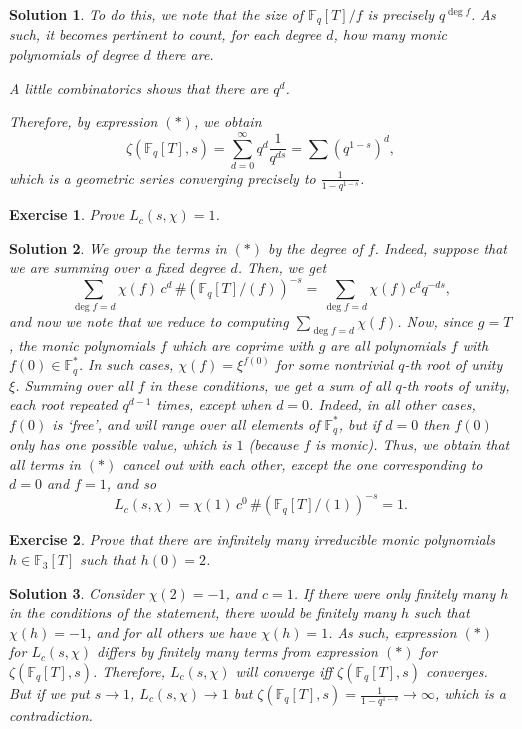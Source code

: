 \documentclass{article}
\newtheorem{ex}{Exercise}
\theoremstyle{nonumberplain}
\newtheorem{sol}{Solution}
\newcommand{\FF}{\mathbb{F}}
\begin{document}
\begin{sol}
To do this, we note that the size of $\FF_q[T]/f$ is precisely $q^{\deg f}$. As such, it becomes pertinent to count, for each degree $d$, how many monic polynomials of degree $d$ there are.

A little combinatorics shows that there are $q^d$.

Therefore, by expression $(*)$, we obtain
\begin{equation}
\zeta(\FF_q[T],s) = \sum_{d=0}^\infty q^d \frac1{q^{ds}} = \sum (q^{1-s})^d,
\end{equation}
which is a geometric series converging precisely to $\frac1{1-q^{1-s}}$.
\end{sol}

\begin{ex}
Prove $L_c(s,\chi) = 1$.
\end{ex}

\begin{sol}
We group the terms in $(*)$ by the degree of $f$. Indeed, suppose that we are summing over a fixed degree $d$. Then, we get
\begin{equation}
\sum_{\deg f = d} \chi(f) \, c^d \, \#(\FF_q[T]/(f))^{-s} = \sum_{\deg f = d} \chi(f) c^d q^{-ds},
\end{equation}
and now we note that we reduce to computing $\sum_{\deg f = d} \chi(f)$. Now, since $g = T$, the monic polynomials $f$ which are coprime with $g$ are all polynomials $f$ with $f(0) \in \FF_q^*$. In such cases, $\chi(f) = \xi^{f(0)}$ for some nontrivial $q$-th root of unity $\xi$. Summing over all $f$ in these conditions, we get a sum of all $q$-th roots of unity, each root repeated $q^{d-1}$ times, \emph{except} when $d = 0$. Indeed, in all other cases, $f(0)$ is `free', and will range over all elements of $\FF_q^*$, but if $d = 0$ then $f(0)$ only has one possible value, which is $1$ (because $f$ is monic). Thus, we obtain that all terms in $(*)$ cancel out with each other, except the one corresponding to $d = 0$ and $f = 1$, and so
\begin{equation}
L_c(s,\chi) = \chi(1) \, c^0 \, \#(\FF_q[T]/(1))^{-s} = 1.
\end{equation}
\end{sol}

\begin{ex}
Prove that there are infinitely many irreducible monic polynomials $h \in \FF_3[T]$ such that $h(0) = 2$.
\end{ex}

\begin{sol}
Consider $\chi(2) = -1$, and $c = 1$. If there were only finitely many $h$ in the conditions of the statement, there would be finitely many $h$ such that $\chi(h) = -1$, and for all others we have $\chi(h) = 1$. As such, expression $(*)$ for $L_c(s,\chi)$ differs by finitely many terms from expression $(*)$ for $\zeta(\FF_q[T],s)$. Therefore, $L_c(s,\chi)$ will converge iff $\zeta(\FF_q[T],s)$ converges. But if we put $s \to 1$, $L_c(s,\chi) \to 1$ but $\zeta(\FF_q[T],s) = \frac1{1-q^{1-s}} \to \infty$, which is a contradiction.
\end{sol}
\end{document}
